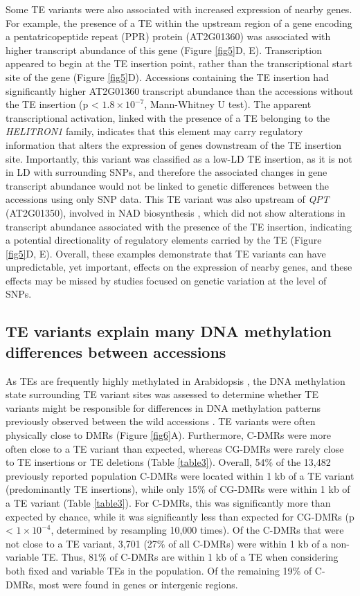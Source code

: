 \documentclass[12pt]{article}
\begin{document}
Some TE variants were also associated with increased expression of
nearby genes. For example, the presence of a TE within the upstream
region of a gene encoding a pentatricopeptide repeat (PPR) protein
(AT2G01360) was associated with higher transcript abundance of this gene
(Figure \ref{fig5}D, E). Transcription appeared to begin at the TE insertion
point, rather than the transcriptional start site of the gene (Figure
\ref{fig5}D). Accessions containing the TE insertion had significantly higher
AT2G01360 transcript abundance than the accessions without the TE
insertion (p \textless{} $1.8 \times10^{-7}$, Mann-Whitney U test). The apparent
transcriptional activation, linked with the presence of a TE belonging
to the \emph{HELITRON1} family, indicates that this element may carry
regulatory information that alters the expression of genes downstream of
the TE insertion site. Importantly, this variant was classified as a
low-LD TE insertion, as it is not in LD with surrounding SNPs, and
therefore the associated changes in gene transcript abundance would not
be linked to genetic differences between the accessions using only SNP
data. This TE variant was also upstream of \emph{QPT }(AT2G01350),
involved in NAD biosynthesis \cite{Katoh:2006if}, which did not show
alterations in transcript abundance associated with the presence of the
TE insertion, indicating a potential directionality of regulatory
elements carried by the TE (Figure \ref{fig5}D, E). Overall, these examples
demonstrate that TE variants can have unpredictable, yet important,
effects on the expression of nearby genes, and these effects may be
missed by studies focused on genetic variation at the level of SNPs.

\subsection{TE variants explain many DNA methylation differences between
accessions}

As TEs are frequently highly methylated in Arabidopsis
\cite{Zhang:2006eo, Zilberman:2007hx, Cokus:2008fc, Lister:2008bh},
the DNA methylation state surrounding TE variant sites was assessed to
determine whether TE variants might be responsible for differences in
DNA methylation patterns previously observed between the wild
accessions \cite{Schmitz:2013iu}. TE variants were often physically
close to DMRs (Figure \ref{fig6}A). Furthermore, C-DMRs were more
often close to a TE variant than expected, whereas CG-DMRs were rarely
close to TE insertions or TE deletions (Table \ref{table3}). Overall,
54\% of the 13,482 previously reported population C-DMRs were located
within 1 kb of a TE variant (predominantly TE insertions), while only
15\% of CG-DMRs were within 1 kb of a TE variant (Table
\ref{table3}). For C-DMRs, this was significantly more than expected
by chance, while it was significantly less than expected for CG-DMRs
(p \textless{} $1 \times10^{-4}$, determined by resampling 10,000
times). Of the C-DMRs that were not close to a TE variant, 3,701 (27\%
of all C-DMRs) were within 1 kb of a non-variable TE. Thus, 81\% of
C-DMRs are within 1 kb of a TE when considering both fixed and
variable TEs in the population. Of the remaining 19\% of C-DMRs, most
were found in genes or intergenic regions.
\end{document}
